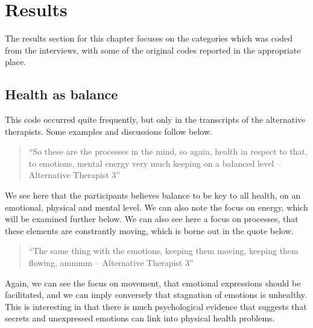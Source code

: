 
\section{Results}

The results section for this chapter focuses on the categories which was coded from the interviews, with some of the original codes reported in the appropriate place. 


\subsection{Health as balance}

This code occurred quite frequently, but only in the transcripts of the alternative therapists. Some examples and discussions follow below. 
\begin{quotation}
``So these are the processes in the mind, so again, health in respect to that, to emotions, mental energy very much keeping on a balanced level – Alternative Therapist 3''  
\end{quotation}


We see here that the participants believes balance to be key to all health, on an emotional, physical and mental level. We can also note the focus on energy, which will be examined further below. We can also see here a focus on processes, that these elements are constrantly moving, which is borne out in the quote below. 
\begin{quotation}
``The same thing with the emotions, keeping them moving, keeping them flowing, ammmm – Alternative Therapist 3''  
\end{quotation}

Again, we can see the focus on movement, that emotional expressions should be facilitated, and we can imply conversely that stagnation of emotions is unhealthy. This is interesting in that there is much psychological evidence that suggests that secrets and unexpressed emotions can link into physical health problems. 

